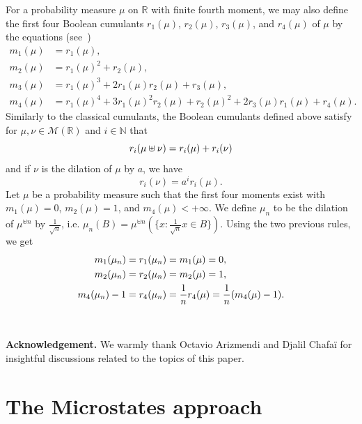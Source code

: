 \documentclass[10pt, reqno]{amsart}
\numberwithin{equation}{section}
\theoremstyle{definition}
\theoremstyle{plain}
\theoremstyle{remark}
\newcommand{\1}{\mathbbm{1}}
\begin{document}
For a probability measure $\mu$ on $\mathbb{R}$ with finite fourth moment, we may also
define the first four Boolean cumulants $r_1(\mu)$, $r_2(\mu)$, $r_3(\mu)$, and $r_4(\mu)$ of $\mu$ by
the equations (see~\cite{arizmendi2018berry,speicher1996boolean})
\begin{align*}
m_1(\mu) &= r_1(\mu), \\
m_2(\mu) &= r_1(\mu)^2 + r_2(\mu), \\
m_3(\mu) &= r_1(\mu)^3 + 2 r_1(\mu) r_2(\mu) + r_3(\mu), \\
m_4(\mu) &= r_1(\mu)^4 + 3 r_1(\mu)^2 r_2(\mu) + r_2(\mu)^2 + 2 r_3(\mu) r_1(\mu) + r_4(\mu).
\end{align*}
Similarly to the classical cumulants, the Boolean cumulants defined above
satisfy for $\mu, \nu \in \mathcal{M}(\mathbb{R})$ and $i \in \mathbb{N}$ that
\begin{equation}
r_i(\mu \uplus \nu) = r_i(\mu) + r_i(\nu)\notag
\end{equation}
and if $\nu$ is the dilation of $\mu$ by $a$, we have
\[
r_i(\nu) = a^i r_i(\mu).\]
Let $\mu$ be a probability measure such that the first four moments exist with $m_1(\mu) = 0$, $m_2(\mu) = 1$,
and $m_4(\mu) < +\infty$.  We define $\mu_n$ to be the dilation of $\mu^{\uplus n}$ by $\frac{1}{\sqrt{n}}$, i.e. $\mu_n(B)=\mu^{\uplus n}(\{x:\frac{1}{\sqrt{n}}x\in B\})$. Using the two previous rules, we get
\begin{align}
m_1(\mu_n)=r_1(\mu_n) &=m_1(\mu)= 0, \notag\\
m_2(\mu_n)=r_2(\mu_n) &=m_2(\mu)= 1,\notag\\
m_4(\mu_n)-1=r_4(\mu_n) &= \frac{1}{n}r_4(\mu)=\frac{1}{n}(m_4(\mu)-1).\label{eq:fourthcumulant}
\end{align}



$ $

\noindent \textbf{Acknowledgement.} We warmly thank Octavio Arizmendi and Djalil Chafaï for insightful discussions related to the topics of this paper.

\setcounter{tocdepth}{2}


\section{The Microstates approach}\label{Sec:booleanentropy}
\end{document}
